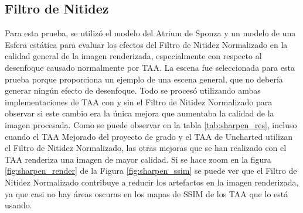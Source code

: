 \documentclass[pregrado]{tesis-usb} %
\begin{document}
\subsection{Filtro de Nitidez}
Para esta prueba, se utilizó el modelo del Atrium de Sponza y un modelo de una Esfera estática para evaluar los efectos del Filtro de Nitidez Normalizado en la calidad general de la imagen renderizada, especialmente con respecto al desenfoque causado normalmente por TAA. La escena fue seleccionada para esta prueba porque proporciona un ejemplo de una escena general, que no debería generar ningún efecto de desenfoque. Todo se procesó utilizando ambas implementaciones de TAA con y sin el Filtro de Nitidez Normalizado para observar si este cambio era la única mejora que aumentaba la calidad de la imagen procesada. Como se puede observar en la tabla \ref{tab:sharpen_res}, incluso cuando el TAA Mejorado del proyecto de grado y el TAA de Uncharted utilizan el Filtro de Nitidez Normalizado, las otras mejoras que se han realizado  con el TAA renderiza una imagen de mayor calidad. Si se hace zoom en la figura \ref{fig:sharpen_render} de la Figura \ref{fig:sharpen_ssim} se puede ver que el Filtro de Nitidez Normalizado contribuye a reducir los artefactos en la imagen renderizada, ya que casi no hay áreas oscuras en los mapas de SSIM de los TAA que lo está usando.
\end{document}

